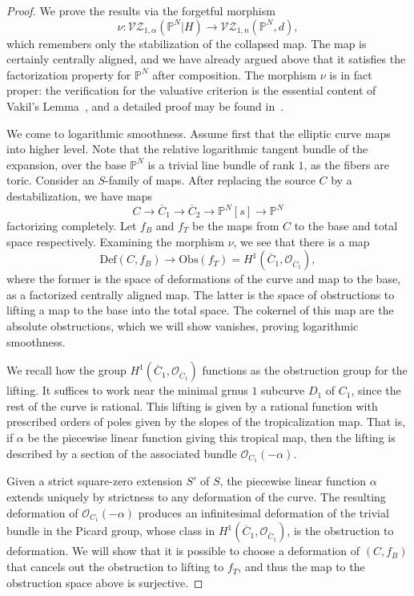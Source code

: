 \documentclass[11pt]{amsart}
\renewcommand{\to}{\rightarrow}
\theoremstyle{definition}
\theoremstyle{definition}
\begin{document}
\begin{proof}
We prove the results via the forgetful morphism
$$
\nu: \mathcal{VZ}_{1,\alpha}(\mathbb P^N|H)\to \mathcal{VZ}_{1,n}(\mathbb P^N,d),
$$
which remembers only the stabilization of the collapsed map. The map is certainly centrally aligned, and we have already argued above that it satisfies the factorization property for $\mathbb P^N$ after composition. The morphism $\nu$ is in fact proper: the verification for the valuative criterion is the essential content of Vakil's Lemma~\cite[Lemma~5.9]{Vak}, and a detailed proof may be found in~\cite[Theorem~4.3]{RSPW}.

We come to logarithmic smoothness. Assume first that the elliptic curve maps into higher level. Note that the relative logarithmic tangent bundle of the expansion, over the base $\mathbb P^N$ is a trivial line bundle of rank $1$, as the fibers are toric. Consider an $S$-family of maps. After replacing the source $C$ by a destabilization, we have maps
\[
C\to \overline{C}_1\to\overline{C}_2\to \mathbb P^N[s]\to \mathbb P^N
\]
factorizing completely. Let $f_B$ and $f_T$ be the maps from $C$ to the base and total space respectively. Examining the morphism $\nu$, we see that there is a map
\[
\mathrm{Def}(C,f_B)\to \mathrm{Obs}(f_T) = H^1(\overline{C}_1,\mathcal O_{\overline{C}_1}),
\]
where the former is the space of deformations of the curve and map to the base, as a factorized centrally aligned map. The latter is the space of obstructions to lifting a map to the base into the total space. The cokernel of this map are the absolute obstructions, which we will show vanishes, proving logarithmic smoothness.

We recall how the group $H^1(\overline{C}_1,\mathcal O_{\overline{C}_1})$ functions as the obstruction group for the lifting. It suffices to work near the minimal grnus $1$ subcurve $D_1$ of $C_1$, since the rest of the curve is rational. This lifting is given by a rational function with prescribed orders of poles given by the slopes of the tropicalization map. That is, if $\alpha$ be the piecewise linear function giving this tropical map, then the lifting is described by a section of the associated bundle $\mathcal O_{C_1}(-\alpha)$.

Given a strict square-zero extension $S'$ of $S$, the piecewise linear function $\alpha$ extends uniquely by strictness to any deformation of the curve. The resulting deformation of $\mathcal O_{C_1}(-\alpha)$ produces an infinitesimal deformation of the trivial bundle in the Picard group, whose class in $H^1(\overline{C}_1,\mathcal O_{\overline{C}_1})$, is the obstruction to deformation. We will show that it is possible to choose a deformation of $(C,f_B)$ that cancels out the obstruction to lifting to $f_T$, and thus the map to the obstruction space above is surjective. 


\end{proof}
\end{document}
